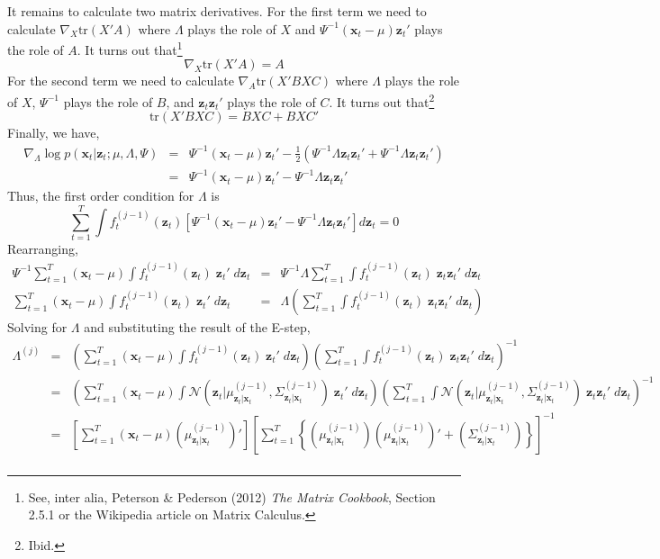 \documentclass[12pt]{article}
\theoremstyle{definition}
\begin{document}
It remains to calculate two matrix derivatives. For the first term we need to calculate $\nabla_X \mbox{tr}(X'A)$ where $\Lambda$ plays the role of $X$ and $\Psi^{-1}(\mathbf{x}_t - \mu)\mathbf{z}_t'$ plays the role of $A$. It turns out that\footnote{See, inter alia, Peterson \& Pederson (2012) \emph{The Matrix Cookbook}, Section 2.5.1 or the Wikipedia article on Matrix Calculus.} 
	$$\nabla_X \mbox{tr}(X'A)  = A$$
For the second term we need to calculate $\nabla_A \mbox{tr}(X'BXC)$ where $\Lambda$ plays the role of $X$, $\Psi^{-1}$ plays the role of $B$, and $\mathbf{z}_t \mathbf{z}_t'$ plays the role of $C$. It turns out that\footnote{Ibid.}
	$$\mbox{tr}(X'BXC) = BXC + BXC'$$
Finally, we have,
	\begin{eqnarray*}
		\nabla_\Lambda \log p(\textbf{x}_t| \textbf{z}_t;\mu, \Lambda, \Psi) &=& \Psi^{-1} (\textbf{x}_t - \mu)\textbf{z}_t' - \frac{1}{2} \left(\Psi^{-1}\Lambda \textbf{z}_t \textbf{z}_t' +  \Psi^{-1}\Lambda \textbf{z}_t \textbf{z}_t'\right)\\
		&=&\Psi^{-1} (\textbf{x}_t - \mu)\textbf{z}_t' - \Psi^{-1}\Lambda \textbf{z}_t \textbf{z}_t' 
	\end{eqnarray*}
Thus, the first order condition for $\Lambda$ is
$$\sum_{t = 1}^T \int f_t^{(j-1)}(\mathbf{z}_t) \left[ \Psi^{-1} (\textbf{x}_t - \mu)\textbf{z}_t' - \Psi^{-1}\Lambda \textbf{z}_t \textbf{z}_t' \right] d \mathbf{z}_t = 0$$
Rearranging,
	\begin{eqnarray*}
		 \Psi^{-1} \sum_{t = 1}^T  (\textbf{x}_t - \mu)\int f_t^{(j-1)}(\mathbf{z}_t) \; \textbf{z}_t' \; d \mathbf{z}_t &=&  \Psi^{-1} \Lambda \sum_{t=1}^T \int f_t^{(j-1)}(\mathbf{z}_t)\; \textbf{z}_t \textbf{z}_t' \; d \mathbf{z}_t\\
		  \sum_{t = 1}^T  (\textbf{x}_t - \mu)\int f_t^{(j-1)}(\mathbf{z}_t) \; \textbf{z}_t' \; d \mathbf{z}_t &=& \Lambda \left(\sum_{t=1}^T \int f_t^{(j-1)}(\mathbf{z}_t)\; \textbf{z}_t \textbf{z}_t' \; d \mathbf{z}_t\right)
	\end{eqnarray*}
Solving for $\Lambda$ and substituting the result of the E-step,
	\begin{eqnarray*}
		\Lambda^{(j)} &=& \left(\sum_{t = 1}^T  (\textbf{x}_t - \mu)\int f_t^{(j-1)}(\mathbf{z}_t) \; \textbf{z}_t' \; d \mathbf{z}_t\right) \left(\sum_{t=1}^T \int f_t^{(j-1)}(\mathbf{z}_t)\; \textbf{z}_t \textbf{z}_t' \; d \mathbf{z}_t\right)^{-1}\\
			&=&\left(\sum_{t = 1}^T  (\textbf{x}_t - \mu)\int \mathcal{N}\left(\mathbf{z}_t|\mu^{(j-1)}_{\mathbf{z}_t|\mathbf{x}_t}, \Sigma^{(j-1)}_{\mathbf{z}_t|\mathbf{x}_t}\right) \; \textbf{z}_t' \; d \mathbf{z}_t\right) \left(\sum_{t=1}^T \int \mathcal{N}\left(\mathbf{z}_t|\mu^{(j-1)}_{\mathbf{z}_t|\mathbf{x}_t}, \Sigma^{(j-1)}_{\mathbf{z}_t|\mathbf{x}_t}\right)\; \textbf{z}_t \textbf{z}_t' \; d \mathbf{z}_t\right)^{-1}\\
			&=& \left[\sum_{t=1}^T (\mathbf{x}_t - \mu)\left(\mu^{(j-1)}_{\mathbf{z}_t|\mathbf{x}_t} \right)'\right]\left[\sum_{t=1}^T \left\{ \left(\mu^{(j-1)}_{\mathbf{z}_t|\mathbf{x}_t} \right)\left(\mu^{(j-1)}_{\mathbf{z}_t|\mathbf{x}_t} \right)' + \left(\Sigma^{(j-1)}_{\mathbf{z}_t|\mathbf{x}_t} \right) \right\}  \right]^{-1}\\
	\end{eqnarray*}
\end{document}
